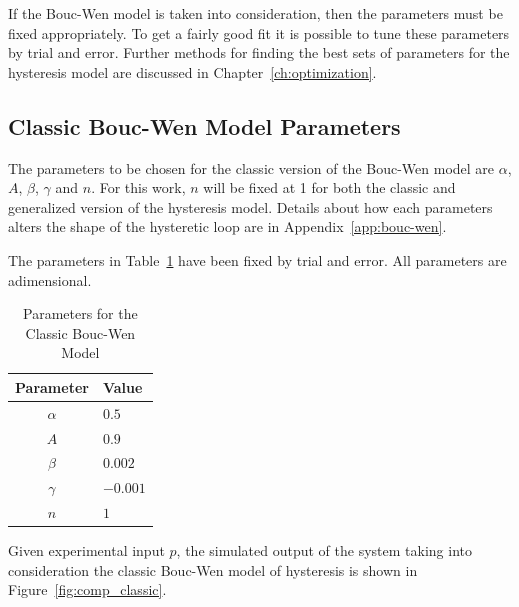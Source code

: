 If the Bouc-Wen model is taken into consideration, then the parameters
must be fixed appropriately. To get a fairly good fit it is possible to tune
these parameters by trial and error. Further methods for finding the best sets
of parameters for the hysteresis model are discussed in Chapter~\ref{ch:optimization}.

\subsection{Classic Bouc-Wen Model Parameters}

\begin{minipage}{0.6\textwidth}
	\vspace*{-0.25cm}
	The parameters to be chosen for the classic version of the Bouc-Wen model are
	$\alpha$, $A$, $\beta$, $\gamma$ and $n$. For this work, $n$ will be fixed at 1
	for both the classic and generalized version of the hysteresis model.
	Details about how each parameters alters the shape of the hysteretic loop
	are in Appendix~\ref{app:bouc-wen}. 
	
	The parameters in Table~\ref{tab:classic_param} have been fixed by trial and error.
	All parameters are adimensional.	
\end{minipage}
\hfill
\begin{minipage}{0.35\textwidth}
	\vspace*{-0.5cm}
	\begin{table}[H]
		\centering
		\begin{tabular}{@{}cl@{}}
			\toprule
			\textbf{Parameter} & \textbf{Value} \\ \midrule
			$\alpha$           & $0.5$          \\
			$A$                & $0.9$          \\
			$\beta$            & $0.002$        \\
			$\gamma$           & $-0.001$       \\
			$n$                & $1$            \\ \bottomrule
		\end{tabular}
		\caption{Parameters for the Classic Bouc-Wen Model}
		\label{tab:classic_param}
	\end{table}
\end{minipage}

\vspace*{0.5cm}

Given experimental input $p$, the simulated output of the system taking into consideration
the classic Bouc-Wen model of hysteresis is shown in Figure~\ref{fig:comp_classic}.


